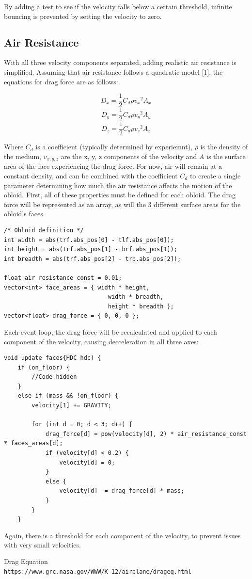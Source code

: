 \documentclass{article}
\begin{document}
By adding a test to see if the velocity falls below a certain threshold, infinite bouncing is prevented by setting the velocity to zero.

\subsection{Air Resistance}
With all three velocity components separated, adding realistic air resistance is simplified. Assuming that air resistance follows a quadratic model [1], the equations for drag force are as follows:

$$ D_x = \frac{1}{2}C_d \rho {v_x}^2 A_x  $$
$$ D_y = \frac{1}{2}C_d \rho {v_y}^2 A_y  $$
$$ D_z = \frac{1}{2}C_d \rho {v_z}^2 A_z  $$

Where $C_d$ is a coefficient (typically determined by experiemnt), $\rho$ is the density of the medium, $v_{x, y, z}$ are the x, y, z components of the velocity and $A$ is the surface area of the face experiencing the drag force. For now, air will remain at a constant density, and can be combined with the coefficient $C_d$ to create a single parameter determining how much the air resistance affects the motion of the obloid.
\newline
\newline
First, all of these properties must be defined for each obloid. The drag force will be represented as an array, as will the 3 different surface areas for the obloid's faces.
\begin{lstlisting}
/* Obloid definition */
int width = abs(trf.abs_pos[0] - tlf.abs_pos[0]);
int height = abs(trf.abs_pos[1] - brf.abs_pos[1]);
int breadth = abs(trf.abs_pos[2] - trb.abs_pos[2]);

float air_resistance_const = 0.01;
vector<int> face_areas = { width * height, 
						  	  width * breadth, 
						  	  height * breadth };
vector<float> drag_force = { 0, 0, 0 };
\end{lstlisting}
Each event loop, the drag force will be recalculated and applied to each component of the velocity, causing decceleration in all three axes:

\begin{lstlisting}
void update_faces{HDC hdc) {
	if (on_floor) {
		//Code hidden
	}
	else if (mass && !on_floor) {
		velocity[1] += GRAVITY;	
	
		for (int d = 0; d < 3; d++) {
			drag_force[d] = pow(velocity[d], 2) * air_resistance_const * faces_areas[d];
			if (velocity[d] < 0.2) {
				velocity[d] = 0;
			}
			else {
				velocity[d] -= drag_force[d] * mass;
			}
		}
	}
\end{lstlisting}
Again, there is a threshold for each component of the velocity, to prevent issues with very small velocities.
\newpage
\begin{thebibliography}{1}
Drag Equation
\\\texttt{https://www.grc.nasa.gov/WWW/K-12/airplane/drageq.html}
\end{thebibliography}
\end{document}
